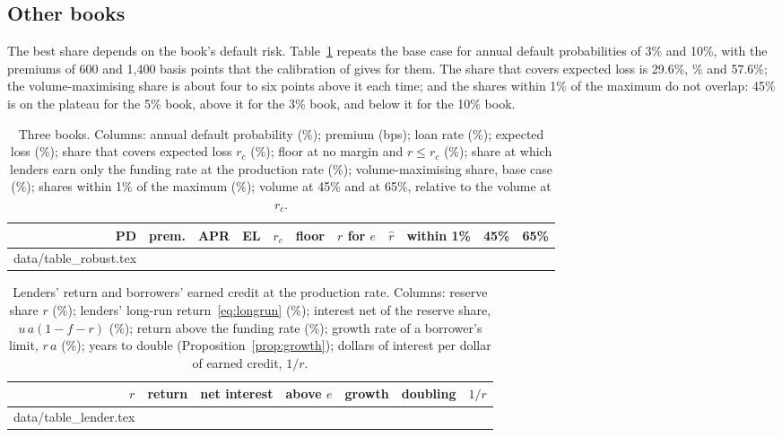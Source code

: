 \documentclass[preprint,11pt,authoryear]{elsarticle}
\makeatletter
\theoremstyle{definition}
\newcommand{\inputrows}[1]{\@@input #1 }
\makeatother
\begin{document}
\subsection{Other books}

The best share depends on the book's default risk. Table~\ref{tab:robust} repeats the base case for annual default
probabilities of 3\% and 10\%, with the premiums of 600 and 1,400 basis points that the calibration of
\citet{pricingreserve2026} gives for them. The share that covers expected loss is 29.6\%, \RC\% and 57.6\%; the volume-maximising
share is about four to six points above it each time; and the shares within 1\% of the maximum do not overlap: 45\% is on the plateau for
the 5\% book, above it for the 3\% book, and below it for the 10\% book.

\begin{table}[ht]
  \centering\small
  \caption{Three books. Columns: annual default probability (\%); premium (bps); loan rate (\%); expected loss (\%);
  share that covers expected loss $r_c$ (\%); floor at no margin and $r\le r_c$ (\%); share at which lenders earn only the funding rate
  at the production rate (\%); volume-maximising share, base case (\%); shares within 1\% of the maximum (\%); volume at
  45\% and at 65\%, relative to the volume at $r_c$.}
  \label{tab:robust}
  \begin{tabular}{rrrrrrrrrrr}
    \toprule
    PD & prem. & APR & EL & $r_c$ & floor & $r$ for $e$ & $\hat r$ & within 1\% & 45\% & 65\% \\
    \midrule
    \inputrows{data/table_robust.tex}
    \bottomrule
  \end{tabular}
\end{table}

\begin{table}[ht]
  \centering\small
  \caption{Lenders' return and borrowers' earned credit at the production rate. Columns: reserve share $r$ (\%); lenders' long-run
  return~\eqref{eq:longrun} (\%); interest net of the reserve share, $u\,a(1-f-r)$ (\%); return above the funding rate (\%);
  growth rate of a borrower's limit, $r\,a$ (\%); years to double (Proposition~\ref{prop:growth}); dollars of interest per dollar of
  earned credit, $1/r$.}
  \label{tab:lender}
  \begin{tabular}{rrrrrrr}
    \toprule
    $r$ & return & net interest & above $e$ & growth & doubling & $1/r$ \\
    \midrule
    \inputrows{data/table_lender.tex}
    \bottomrule
  \end{tabular}
\end{table}
\end{document}
